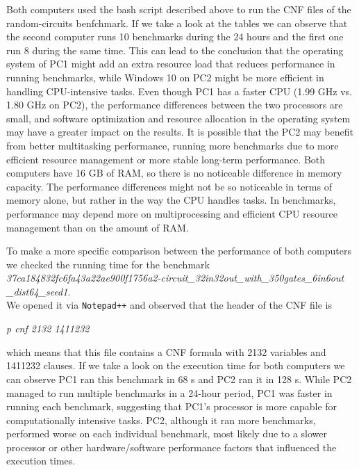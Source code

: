 \documentclass[runningheads]{llncs}
\begin{document}
Both computers used the bash script described above to run the CNF files of the random-circuits benfchmark. If we take a look at the tables we can observe that the second computer runs 10 benchmarks during the 24 hours and the first one run 8 during the same time. This can lead to the conclusion that the operating system of PC1 might add an extra resource load that reduces performance in running benchmarks, while Windows 10 on PC2 might be more efficient in handling CPU-intensive tasks.
Even though PC1 has a faster CPU (1.99 GHz vs. 1.80 GHz on PC2), the performance differences between the two processors are small, and software optimization and resource allocation in the operating system may have a greater impact on the results.
It is possible that the PC2 may benefit from better multitasking performance, running more benchmarks due to more efficient resource management or more stable long-term performance.  Both computers have 16 GB of RAM, so there is no noticeable difference in memory capacity.
The performance differences might not be so noticeable in terms of memory alone, but rather in the way the CPU handles tasks. In benchmarks, performance may depend more on multiprocessing and efficient CPU resource management than on the amount of RAM.

To make a more specific comparison between the performance of both computers we checked the running time for the benchmark \\

\textit{37ca184832fc6fa43a22ae900f1756a2-circuit\_32in32out\_with\_350gates\_6in6out
\_dist64\_seed1}. \\

We opened it via \texttt{Notepad++} and observed that the header of the CNF file is
\begin{center}
\textit{p cnf 2132 1411232} 
\end{center}

which means that this file contains a CNF formula with 2132 variables and 1411232 clauses. If we take a look on the execution time for both computers we can observe PC1 ran this benchmark in 68 s and PC2 ran it in 128 s. While PC2 managed to run multiple benchmarks in a 24-hour period, PC1 was faster in running each benchmark, suggesting that PC1's processor is more capable for computationally intensive tasks. PC2, although it ran more benchmarks, performed worse on each individual benchmark, most likely due to a slower processor or other hardware/software performance factors that influenced the execution times.
\end{document}
